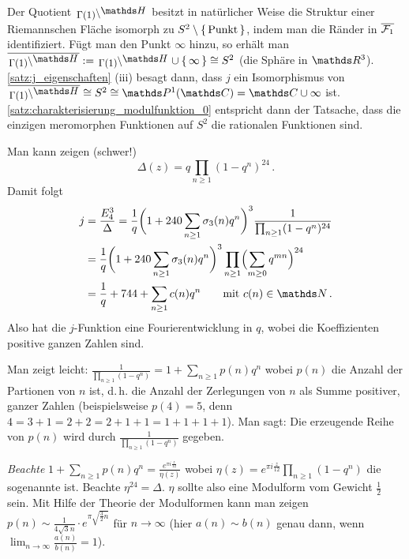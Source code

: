 \begin{beme-list}
	\item Der Quotient $\linksmodulo{\Gamma(1)}{\HH}$ besitzt in natürlicher Weise die Struktur einer Riemannschen Fläche isomorph zu $S^2 \setminus\left\{\,\text{Punkt}\,\right\}$, indem man die Ränder in $\overline{\mathcal{F}_1}$ identifiziert.
	Fügt man den Punkt $\infty$ hinzu, so erhält man $\closure{\linksmodulo{\Gamma(1)}{\HH}} := \linksmodulo{\Gamma(1)}{\HH} \cup \Set{\infty} \cong S^2$ (die Sphäre in $\RR^3$).
	\autoref{satz:j_eigenschaften} (iii) besagt dann, dass $j$ ein Isomorphismus von $\closure{\linksmodulo{\Gamma(1)}{\HH}} \cong S^2 \cong \mathds P^1(\CC) = \CC \cup \infty$ ist.
	\autoref{satz:charakterisierung_modulfunktion_0} entspricht dann der Tatsache, dass die einzigen meromorphen Funktionen auf $S^2$ die rationalen Funktionen sind.
	
	\item Man kann zeigen (schwer!)
	\[
	\Delta(z) = q \prod_{n\geq1} (1-q^n)^{24}
	\,.
	\]
	Damit folgt
	\begin{align*}
	j
	&= \frac{E_4^3}{\Delta}
	= \frac{1}{q} \biggl(1 + 240\sum_{n\geq1} \sigma_3(n)q^n\biggr)^3 \frac{1}{\prod_{n\geq1} (1 - q^n)^{24}} \\
	&= \frac{1}{q} \biggl(1 + 240\sum_{n\geq1} \sigma_3(n)q^n\biggr)^3 \prod_{n\geq1} \Bigl(\sum_{m\geq0} q^{mn}\Bigr)^{24} \\
	&= \frac{1}{q} + 744 + \sum_{n \geq 1} c(n)q^n \qquad \text{mit } c(n) \in \NN
	\,.
	\end{align*}
	Also hat die $j$-Funktion eine Fourierentwicklung in $q$, wobei die Koeffizienten positive ganzen Zahlen sind.
	
	\item Man zeigt leicht: $\frac{1}{\prod_{n\geq1} (1-q^n)} = 1 + \sum_{n\geq1} p(n)q^n$ wobei $p(n)$ die Anzahl der Partionen von $n$ ist, d.\,h. die Anzahl der Zerlegungen von $n$ als Summe positiver, ganzer Zahlen (beispielsweise $p(4) = 5$, denn $4 = 3 + 1 = 2 + 2 = 2 + 1 + 1 = 1 + 1 + 1 + 1$).
	Man sagt: Die erzeugende Reihe von $p(n)$ wird durch $\frac{1}{\prod_{n\geq1} (1-q^n)}$ gegeben.
	
	\emph{Beachte} $1 + \sum_{n\geq1} p(n)q^n = \frac{e^{\pi i\frac{z}{12}}}{\eta(z)}$ wobei $\eta(z) = e^{\pi i\frac{z}{12}} \prod_{n\geq1} (1-q^n)$ die sogenannte  ist.
	Beachte $\eta^{24} = \Delta$.
	$\eta$ sollte also eine Modulform vom Gewicht $\frac{1}{2}$ sein.
	Mit Hilfe der Theorie der Modulformen kann man zeigen $p(n) \sim \frac{1}{4\sqrt 3 n} \cdot e^{\pi \sqrt{\frac{3}{2}n}}$ für $n\to\infty$ (hier $a(n) \sim b(n)$ genau dann, wenn $\lim_{n\to\infty} \frac{a(n)}{b(n)} = 1$).
\end{beme-list}
